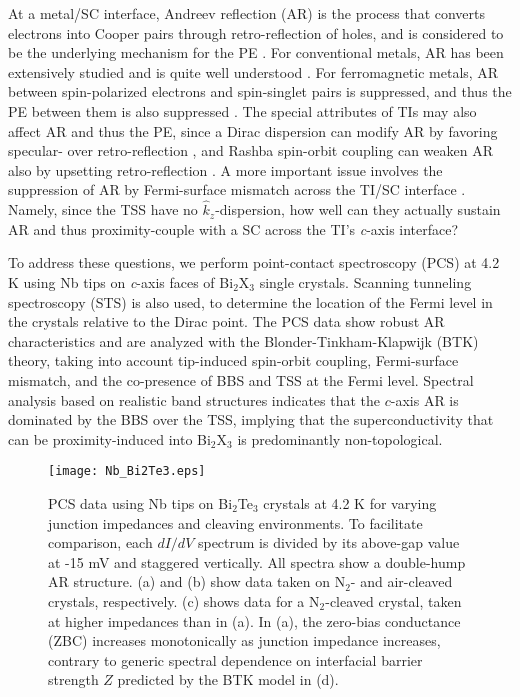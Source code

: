 \documentclass[aps,prl,twocolumn,showpacs,amsmath,amssymb,superscriptaddress,citeautoscript]{revtex4-1}
\begin{document}
At a metal/SC interface, Andreev reflection (AR) is the process that converts electrons into Cooper pairs through retro-reflection of holes, and is considered to be the underlying mechanism for the PE \cite{Pannetier2000,Klapwijk2004}.  For conventional metals, AR has been extensively studied and is quite well understood \cite{Blonder1982,Blonder1983,Deutscher2005,Nadgorny2011}. For ferromagnetic metals, AR between spin-polarized electrons and spin-singlet pairs is suppressed, and thus the PE between them is also suppressed \cite{Jong1995,Upadhyay1998,Soulen1998,Ji2001,Zutic2004,Buzdin2005,Nadgorny2011,Turel2011,Chen2012}. The special attributes of TIs may also affect AR and thus the PE, since a Dirac dispersion can modify AR by favoring specular- over retro-reflection \cite{Beenakker2006,Linder2008}, and Rashba spin-orbit coupling can weaken AR also by upsetting retro-reflection \cite{Yokoyama2006,Wu2010,Kononov2013,Hoegl2015}.  A more important issue involves the suppression of AR by Fermi-surface mismatch across the TI/SC interface \cite{Blonder1983,Daghero2011,Yilmaz2014}.  Namely, since the TSS have no $\hat{k}_z$-dispersion, how well can they actually sustain AR and thus proximity-couple with a SC across the TI's \textit{c}-axis interface?



To address these questions, we perform point-contact spectroscopy (PCS) at 4.2 K using Nb tips on \textit{c}-axis faces of Bi$_{2}$X$_{3}$ single crystals.  Scanning tunneling spectroscopy (STS) is also used, to determine the location of the Fermi level in the crystals relative to the Dirac point.  The PCS data show robust AR characteristics and are analyzed with the Blonder-Tinkham-Klapwijk (BTK) theory, taking into account tip-induced spin-orbit coupling, Fermi-surface mismatch, and the co-presence of BBS and TSS at the Fermi level. Spectral analysis based on realistic band structures indicates that the $c$-axis AR is dominated by the BBS over the TSS, implying that the superconductivity that can be proximity-induced into Bi$_{2}$X$_{3}$ is predominantly non-topological.

\begin{figure}[th]
\texttt{[image: Nb\_Bi2Te3.eps]}
\caption{\label{fig:NbBi2Te3} 
PCS data using Nb tips on Bi$_{2}$Te$_{3}$ crystals at 4.2 K for varying junction impedances and cleaving environments. To facilitate comparison, each $dI/dV$ spectrum is divided by its above-gap value at -15 mV and staggered vertically. All spectra show a double-hump AR structure. (a) and (b) show data taken on N$_2$- and air-cleaved crystals, respectively. (c) shows data for a N$_2$-cleaved crystal, taken at higher impedances than in (a). In (a), the zero-bias conductance (ZBC) increases monotonically as junction impedance increases, contrary to generic spectral dependence on interfacial barrier strength $Z$ predicted by the BTK model \cite{Blonder1982} in (d).}
\end{figure}
\end{document}
